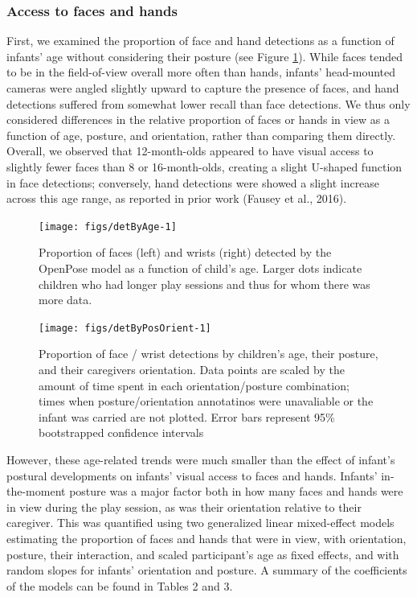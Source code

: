 \documentclass[english,man]{apa6}
\begin{document}
\subsubsection{Access to faces and
hands}\label{access-to-faces-and-hands}

First, we examined the proportion of face and hand detections as a
function of infants' age without considering their posture (see Figure
\ref{fig:detByAge}). While faces tended to be in the field-of-view
overall more often than hands, infants' head-mounted cameras were angled
slightly upward to capture the presence of faces, and hand detections
suffered from somewhat lower recall than face detections. We thus only
considered differences in the relative proportion of faces or hands in
view as a function of age, posture, and orientation, rather than
comparing them directly. Overall, we observed that 12-month-olds
appeared to have visual access to slightly fewer faces than 8 or
16-month-olds, creating a slight U-shaped function in face detections;
conversely, hand detections were showed a slight increase across this
age range, as reported in prior work (Fausey et al., 2016).

\begin{figure}[H]
\texttt{[image: figs/detByAge-1]} \caption{Proportion of faces (left) and wrists (right) detected by the OpenPose model as a function of child's age. Larger dots indicate children who had longer play sessions and thus for whom there was more data.}\label{fig:detByAge}
\end{figure}

\begin{figure}[H]

{\centering \texttt{[image: figs/detByPosOrient-1]} 

}

\caption{Proportion of face / wrist detections by children's age, their posture, and their caregivers orientation. Data points are scaled by the amount of time spent in each orientation/posture combination; times when posture/orientation annotatinos were unavaliable or the infant was carried are not plotted. Error bars represent 95\% bootstrapped confidence intervals}\label{fig:detByPosOrient}
\end{figure}

However, these age-related trends were much smaller than the effect of
infant's postural developments on infants' visual access to faces and
hands. Infants' in-the-moment posture was a major factor both in how
many faces and hands were in view during the play session, as was their
orientation relative to their caregiver. This was quantified using two
generalized linear mixed-effect models estimating the proportion of
faces and hands that were in view, with orientation, posture, their
interaction, and scaled participant's age as fixed effects, and with
random slopes for infants' orientation and posture. A summary of the
coefficients of the models can be found in Tables 2 and 3.
\end{document}
